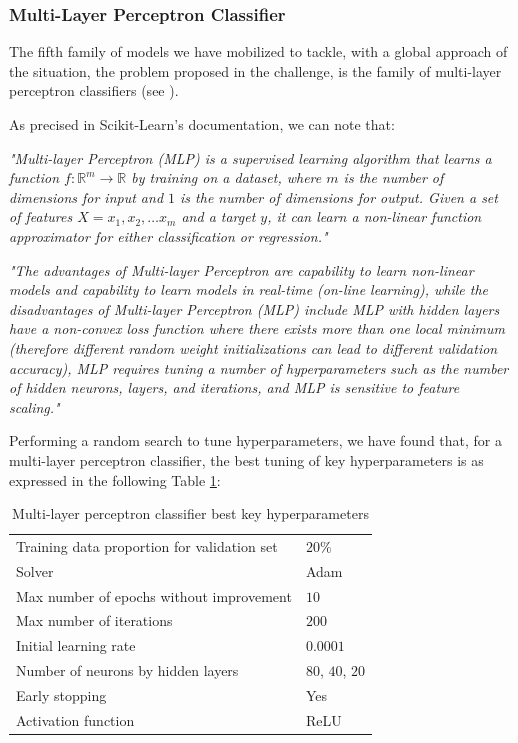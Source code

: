\documentclass[twocolumn, switch]{article}
\begin{document}
\subsubsection{Multi-Layer Perceptron Classifier}

The fifth family of models we have mobilized to tackle, with a global approach of the situation, the problem proposed in the challenge, is the family of multi-layer perceptron classifiers (see \cite{Hinton_1990}).

As precised in Scikit-Learn's documentation, we can note that:

\textit{"Multi-layer Perceptron (MLP) is a supervised learning algorithm that learns a function $f : \mathbb{R}^m \longrightarrow \mathbb{R}$ by training on a dataset, where $m$ is the number of dimensions for input and $1$ is the number of dimensions for output. Given a set of features $X = x_1, x_2, \ldots x_m$ and a target $y$, it can learn a non-linear function approximator for either classification or regression."}

\textit{"The advantages of Multi-layer Perceptron are capability to learn non-linear models and capability to learn models in real-time (on-line learning), while the disadvantages of Multi-layer Perceptron (MLP) include MLP with hidden layers have a non-convex loss function where there exists more than one local minimum (therefore different random weight initializations can lead to different validation accuracy), MLP requires tuning a number of hyperparameters such as the number of hidden neurons, layers, and iterations, and MLP is sensitive to feature scaling."}

Performing a random search to tune hyperparameters, we have found that, for a multi-layer perceptron classifier, the best tuning of key hyperparameters is as expressed in the following Table \ref{tab:mlpchyp}:

\begin{table}[H]
\caption{Multi-layer perceptron classifier best key hyperparameters}
\centering
\begin{tabular}{ll}
\toprule
Training data proportion for validation set & $20\%$ \\
Solver & Adam \\
Max number of epochs without improvement & $10$ \\
Max number of iterations & $200$ \\
Initial learning rate & $0.0001$ \\
Number of neurons by hidden layers & $80$, $40$, $20$ \\
Early stopping & Yes \\
Activation function & ReLU \\
\bottomrule
\end{tabular}
\label{tab:mlpchyp}
\end{table}
\end{document}

